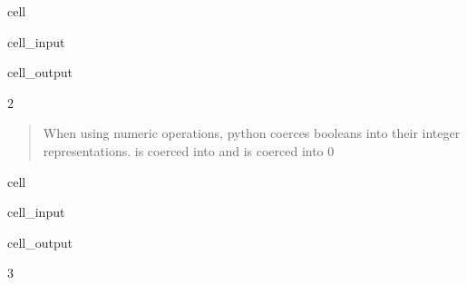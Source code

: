 \documentclass[letterpaper,10pt,english]{jupyterBook}
\begin{document}
\begin{sphinxuseclass}{cell}\begin{sphinxVerbatimInput}

\begin{sphinxuseclass}{cell_input}
\begin{sphinxVerbatim}[commandchars=\\\{\}]
  
\end{sphinxVerbatim}

\end{sphinxuseclass}\end{sphinxVerbatimInput}
\begin{sphinxVerbatimOutput}

\begin{sphinxuseclass}{cell_output}
\begin{sphinxVerbatim}[commandchars=\\\{\}]
2
\end{sphinxVerbatim}

\end{sphinxuseclass}\end{sphinxVerbatimOutput}

\end{sphinxuseclass}\begin{quote}

\sphinxAtStartPar
When using numeric operations, python coerces booleans into their integer representations.  is coerced into  and  is coerced into 0
\end{quote}

\begin{sphinxuseclass}{cell}\begin{sphinxVerbatimInput}

\begin{sphinxuseclass}{cell_input}
\begin{sphinxVerbatim}[commandchars=\\\{\}]
    
\end{sphinxVerbatim}

\end{sphinxuseclass}\end{sphinxVerbatimInput}
\begin{sphinxVerbatimOutput}

\begin{sphinxuseclass}{cell_output}
\begin{sphinxVerbatim}[commandchars=\\\{\}]
3
\end{sphinxVerbatim}

\end{sphinxuseclass}\end{sphinxVerbatimOutput}

\end{sphinxuseclass}
\end{document}
